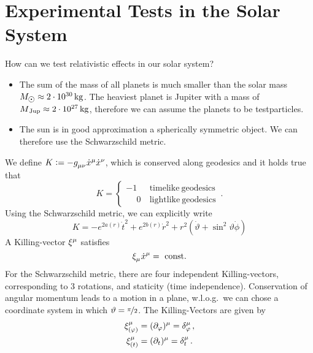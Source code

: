 \chapter{Experimental Tests in the Solar System}
How can we test relativistic effects in our solar system?
\begin{itemize}
  \item The sum of the mass of all planets is much smaller than the solar mass
  $M_{\astrosun}\approx \unit[2\cdot 10^{30}]{kg}$. The heaviest planet is
  Jupiter with a mass of $M\textsubscript{Jup}\approx \unit[2\cdot
  10^{27}]{kg}$, therefore we can assume the planets to be testparticles.
  \item The sun is in good approximation a spherically symmetric object. We can
  therefore use the Schwarzschild metric.
\end{itemize}
We define
$K:=-\tensor{g}{_\mu_\nu}\tensor{\dot{x}}{^\mu}\tensor{\dot{x}}{^\nu}$, which is
conserved along geodesics and it holds true that
\begin{equation} 
K=\begin{cases}
-1& \mathrm{\ timelike\ geodesics}\\
\phantom{-}0& \mathrm{\ lightlike\ geodesics}
\end{cases}\,.
\end{equation}
Using the Schwarzschild metric, we can explicitly write
\begin{equation}
K=-e^{2a(r)}\dot{t}^2+e^{2b(r)}\dot{r}^2+r^2\left(\dot{\vartheta}+\sin^2\vartheta
\dot{\phi}\right)
\end{equation}
A Killing-vector $\tensor{\xi}{^\mu}$ satisfies
\begin{equation}
\tensor{\xi}{_\mu}\tensor{\dot{x}}{^\mu}=\mathrm{\ const.}
\end{equation}
For the Schwarzschild metric, there are four independent Killing-vectors,
corresponding to 3 rotations, and staticity (time independence).
Conservation of angular momentum leads to a motion in a plane, w.l.o.g.\ we can
chose a coordinate system in which $\vartheta=\nicefrac{\pi}{2}$.
The Killing-Vectors are given by
\begin{align}
\tensor*{\xi}{_{(\varphi)}^\mu}&=(\partial_\varphi)^\mu=\tensor*{\delta}{_\varphi^\mu}\,,\\
\tensor*{\xi}{_{(t)}^\mu}&=(\partial_t)^\mu=\tensor*{\delta}{_t^\mu}\,.
\end{align}
